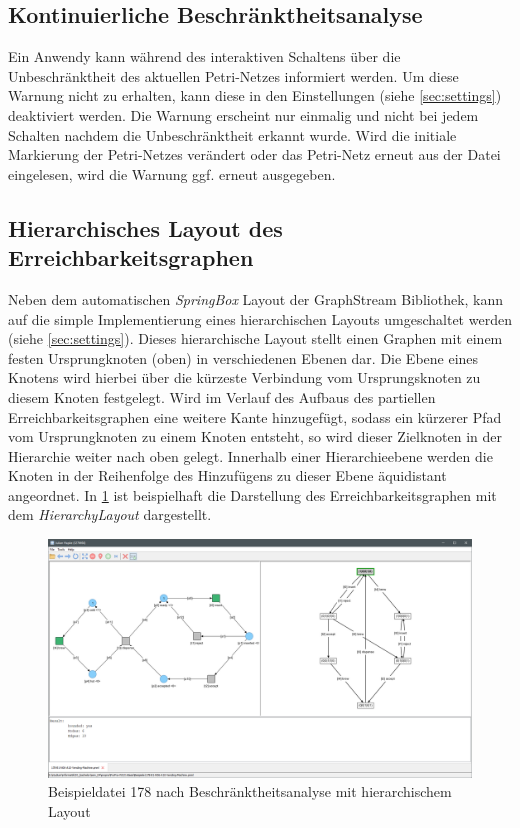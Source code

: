 \subsection{Kontinuierliche Beschränktheitsanalyse}
Ein Anwendy kann während des interaktiven Schaltens über die Unbeschränktheit
des aktuellen Petri-Netzes informiert werden. Um diese Warnung nicht zu
erhalten, kann diese in den Einstellungen (siehe \cref{sec:settings})
deaktiviert werden. Die Warnung erscheint nur einmalig und nicht bei jedem
Schalten nachdem die Unbeschränktheit erkannt wurde. Wird die initiale
Markierung der Petri-Netzes verändert oder das Petri-Netz erneut aus der Datei
eingelesen, wird die Warnung ggf. erneut ausgegeben.

\subsection{Hierarchisches Layout des Erreichbarkeitsgraphen}
Neben dem automatischen \emph{SpringBox} Layout der GraphStream Bibliothek, kann
auf die simple Implementierung eines hierarchischen Layouts umgeschaltet werden
(siehe \cref{sec:settings}). Dieses hierarchische Layout stellt einen Graphen
mit einem festen Ursprungknoten (oben) in verschiedenen Ebenen dar. Die Ebene
eines Knotens wird hierbei über die kürzeste Verbindung vom Ursprungsknoten zu
diesem Knoten festgelegt. Wird im Verlauf des Aufbaus des partiellen
Erreichbarkeitsgraphen eine weitere Kante hinzugefügt, sodass ein kürzerer Pfad
vom Ursprungknoten zu einem Knoten entsteht, so wird dieser Zielknoten in der
Hierarchie weiter nach oben gelegt. Innerhalb einer Hierarchieebene werden die
Knoten in der Reihenfolge des Hinzufügens zu dieser Ebene äquidistant
angeordnet. In \cref{img:ex178_hierarchy} ist beispielhaft die Darstellung des
Erreichbarkeitsgraphen mit dem \emph{HierarchyLayout} dargestellt.

\begin{figure}[ht!]
  \centering
  \includegraphics[width=\textwidth]{../img/Screenshot_178_hierarchy_layout.png}
  \caption{Beispieldatei 178 nach Beschränktheitsanalyse mit hierarchischem Layout}
  \label{img:ex178_hierarchy}
\end{figure}

